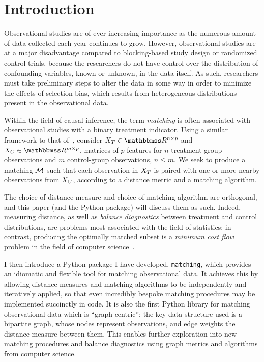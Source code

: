 \documentclass[11pt]{extarticle}
\begin{document}
\tableofcontents{}
\newpage{}


\section{Introduction}
\label{sec:intro}

Observational studies are of ever-increasing importance as the numerous amount of data collected each year continues to grow.
However, observational studies are at a major disadvantage compared to blocking-based study design or randomized control trials, because the researchers do not have control over the distribution of confounding variables, known or unknown, in the data itself. As such, researchers must take preliminary steps to alter the data in some way in order to minimize the effects of selection bias, which results from heterogeneous distributions present in the observational data.

Within the field of causal inference, the term \emph{matching} is often associated with observational studies with a binary treatment indicator.
Using a similar framework to that of~\textcite{iacus_multivariate_2011}, consider $\mat{X}_T \in \reals^{n \times p}$ and $\mat{X}_C \in \reals^{m \times p}$, matrices of $p$ features for $n$ treatment-group observations and $m$ control-group observations, $n \leq m$.
We seek to produce a matching $\mathcal{M}$ such that each observation in $X_T$ is paired with one or more nearby observations from $X_C$, according to a distance metric and a matching algorithm.

The choice of distance measure and choice of matching algorithm are orthogonal, and this paper (and the Python package) will discuss them as such. Indeed, measuring distance, as well as \emph{balance diagnostics} between treatment and control distributions, are problems most associated with the field of statistics; in contrast, producing the optimally matched subset is a \emph{minimum cost flow} problem in the field of computer science~\parencite{rosenbaum_optimal_1989}.

I then introduce a Python package I have developed, \texttt{matching}, which provides an idiomatic and flexible tool for matching observational data. It achieves this by allowing distance measures and matching algorithms to be independently and iteratively applied, so that even incredibly bespoke matching procedures may be implemented succinctly in code. It is also the first Python library for matching observational data which is ``graph-centric'': the key data structure used is a bipartite graph, whose nodes represent observations, and edge weights the distance measure between them. This enables further exploration into new matching procedures and balance diagnostics using graph metrics and algorithms from computer science.
\end{document}
